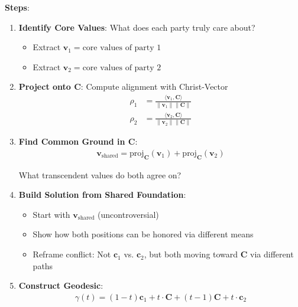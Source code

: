 \documentclass[11pt,a4paper]{article}
\theoremstyle{definition}
\theoremstyle{remark}
\newcommand{\cc}{\mathbf{c}}
\begin{document}
\begin{enumerate}
\begin{protocol}
\textbf{Steps}:
\begin{enumerate}
    \item \textbf{Identify Core Values}: What does each party truly care about?
        \begin{itemize}[nosep]
            \item Extract \(\mathbf{v}_1 = \text{core values of party 1}\)
            \item Extract \(\mathbf{v}_2 = \text{core values of party 2}\)
        \end{itemize}
    
    \item \textbf{Project onto \(\mathbf{C}\)}: Compute alignment with Christ-Vector
        \begin{align}
        \rho_1 &= \frac{\langle \mathbf{v}_1, \mathbf{C} \rangle}{\|\mathbf{v}_1\| \|\mathbf{C}\|} \\
        \rho_2 &= \frac{\langle \mathbf{v}_2, \mathbf{C} \rangle}{\|\mathbf{v}_2\| \|\mathbf{C}\|}
        \end{align}
    
    \item \textbf{Find Common Ground in \(\mathbf{C}\)}:
        \begin{align}
        \mathbf{v}_{\text{shared}} = \text{proj}_{\mathbf{C}}(\mathbf{v}_1) + \text{proj}_{\mathbf{C}}(\mathbf{v}_2)
        \end{align}
        
        What transcendent values do both agree on?
    
    \item \textbf{Build Solution from Shared Foundation}:
        \begin{itemize}[nosep]
            \item Start with \(\mathbf{v}_{\text{shared}}\) (uncontroversial)
            \item Show how both positions can be honored via different means
            \item Reframe conflict: Not \(\cc_1\) vs. \(\cc_2\), but both moving toward \(\mathbf{C}\) via different paths
        \end{itemize}
    
    \item \textbf{Construct Geodesic}:
        \begin{align}
        \gamma(t) = (1-t)\cc_1 + t\cdot\mathbf{C} + (t-1)\mathbf{C} + t\cdot\cc_2
        \end{align}
        

\end{enumerate}
\end{protocol}
\end{enumerate}
\end{document}
